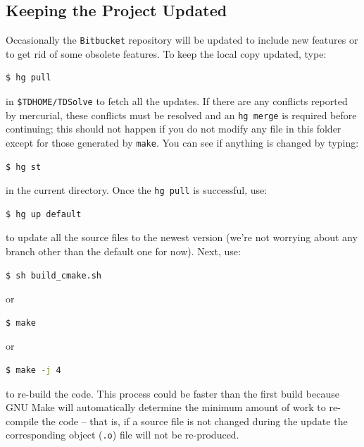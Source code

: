 \documentclass{amsproc}
\theoremstyle{definition}
\theoremstyle{remark}
\numberwithin{equation}{section}
\numberwithin{figure}{section}
\begin{document}
\subsection{Keeping the Project Updated}
Occasionally the \texttt{Bitbucket} repository will be updated to include new features or to get rid of some obsolete features.
To keep the local copy updated, type:
\begin{lstlisting}[backgroundcolor = \color{lightgray}, language = bash, xleftmargin = 0.1cm, framexleftmargin = 0.0cm]
$ hg pull
\end{lstlisting}
in \texttt{\$TDHOME/TDSolve} to fetch all the updates.
If there are any conflicts reported by mercurial, these conflicts must be resolved and an \texttt{hg merge} is required before continuing; this should not happen if you do not modify any file in this folder except for those generated by \texttt{make}.
You can see if anything is changed by typing:
\begin{lstlisting}[backgroundcolor = \color{lightgray}, language = bash, xleftmargin = 0.1cm, framexleftmargin = 0.0cm]
$ hg st
\end{lstlisting}
in the current directory.
Once the \texttt{hg pull} is successful, use:
\begin{lstlisting}[backgroundcolor = \color{lightgray}, language = bash, xleftmargin = 0.1cm, framexleftmargin = 0.0cm]
$ hg up default
\end{lstlisting}
to update all the source files to the newest version (we're not worrying about any branch other than the default one for now).
Next, use:
\begin{lstlisting}[backgroundcolor = \color{lightgray}, language = bash, xleftmargin = 0.1cm, framexleftmargin = 0.0cm]
$ sh build_cmake.sh
\end{lstlisting}
or
\begin{lstlisting}[backgroundcolor = \color{lightgray}, language = bash, xleftmargin = 0.1cm, framexleftmargin = 0.0cm]
$ make 
\end{lstlisting}
or
\begin{lstlisting}[backgroundcolor = \color{lightgray}, language = bash, xleftmargin = 0.1cm, framexleftmargin = 0.0cm]
$ make -j 4
\end{lstlisting}
to re-build the code.
This process could be faster than the first build because GNU Make will automatically determine the minimum amount of work to re-compile the code -- that is, if a source file is not changed during the update the corresponding object (\texttt{.o}) file will not be re-produced.
\end{document}
